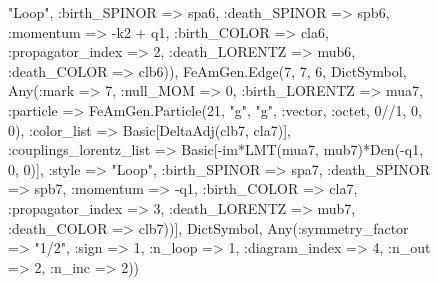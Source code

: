 \documentclass{revtex4}
\begin{document}
\begin{figure}[!htb]
\begin{center}
{"Loop", :birth_SPINOR => spa6, :death_SPINOR => spb6, :momentum => -k2 + q1, :birth_COLOR => cla6, :propagator_index => 2, :death_LORENTZ => mub6, :death_COLOR => clb6)), FeAmGen.Edge(7, 7, 6, Dict{Symbol, Any}(:mark => 7, :null_MOM => 0, :birth_LORENTZ => mua7, :particle => FeAmGen.Particle(21, "g", "g", :vector, :octet, 0//1, 0, 0), :color_list => Basic[DeltaAdj(clb7, cla7)], :couplings_lorentz_list => Basic[-im*LMT(mua7, mub7)*Den(-q1, 0, 0)], :style => "Loop", :birth_SPINOR => spa7, :death_SPINOR => spb7, :momentum => -q1, :birth_COLOR => cla7, :propagator_index => 3, :death_LORENTZ => mub7, :death_COLOR => clb7))], Dict{Symbol, Any}(:symmetry_factor => "1/2", :sign => 1, :n_loop => 1, :diagram_index => 4, :n_out => 2, :n_inc => 2)) 
}
\end{center}
\end{figure}
\end{document}
